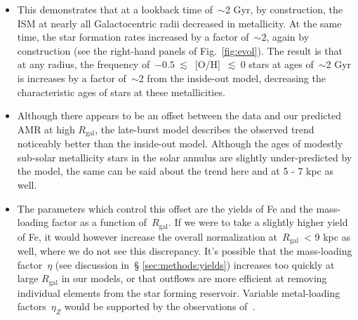 \documentclass[fleqn, usenatbib]{mnras}
\begin{document}
\begin{itemize}
\begin{itemize}
\begin{itemize}
			\item This demonstrates that at a lookback time of~$\sim$2 Gyr, by 
			construction, the ISM at nearly all Galactocentric radii decreased 
			in metallicity. At the same time, the star formation rates 
			increased by a factor of~$\sim$2, again by construction (see the 
			right-hand panels of Fig.~\ref{fig:evol}). The result is that at 
			any radius, the frequency of~$-0.5~\lesssim$~[O/H]~$\lesssim~0$ 
			stars at ages of~$\sim$2 Gyr is increases by a factor of~$\sim$2 
			from the inside-out model, decreasing the characteristic ages of 
			stars at these metallicities. 

			\item Although there appears to be an offset between the 
			\citet{Feuillet2019} data and our predicted AMR at high 
			$R_\text{gal}$, the late-burst model describes the observed trend 
			noticeably better than the inside-out model. Although the ages of 
			modestly sub-solar metallicity stars in the solar annulus are 
			slightly under-predicted by the model, the same can be said about 
			the trend here and at 5 - 7 kpc as well. 

			\item The parameters which control this offset are the yields of 
			Fe and the mass-loading factor as a function of~$R_\text{gal}$. 
			If we were to take a slightly higher yield of Fe, it would however 
			increase the overall normalization at~$R_\text{gal}$~< 9 kpc as 
			well, where we do not see this discrepancy. It's possible that the 
			mass-loading factor~$\eta$ (see discussion in~\S 
			\ref{sec:methods:yields}) increases too quickly at large 
			$R_\text{gal}$ in our models, or that outflows are more efficient 
			at removing individual elements from the star forming reservoir. 
			Variable metal-loading factors~$\eta_Z$ would be supported by the 
			observations of~\citet*{Chisholm2018}. 


\end{itemize}
\end{itemize}
\end{itemize}
\end{document}
